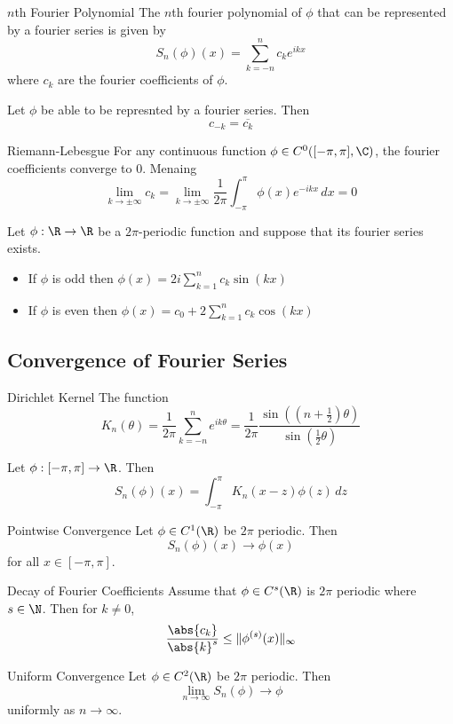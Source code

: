 \documentclass[a4paper]{article}
\begin{document}
\begin{defn}{$n$th Fourier Polynomial}{} The $n$th fourier polynomial of $\phi$ that can be represented by a fourier series is given by $$S_n(\phi)(x)=\sum_{k=-n}^nc_ke^{ikx}$$ where $c_k$ are the fourier coefficients of $\phi$. 
\end{defn}

\begin{lmm}{}{} Let $\phi$ be able to be represnted by a fourier series. Then $$c_{-k}=\overline{c_k}$$
\end{lmm}

\begin{lmm}{Riemann-Lebesgue}{} For any continuous function $\phi\in C^0([-\pi,\pi],\C)$, the fourier coefficients converge to $0$. Menaing $$\lim_{k\to\pm\infty}c_k=\lim_{k\to\pm\infty}\frac{1}{2\pi}\int_{-\pi}^\pi\phi(x)e^{-ikx}\,dx=0$$
\end{lmm}

\begin{lmm} Let $\phi:\R\to\R$ be a $2\pi$-periodic function and suppose that its fourier series exists. 
\begin{itemize}
\item If $\phi$ is odd then $\phi(x)=2i\sum_{k=1}^nc_k\sin(kx)$
\item If $\phi$ is even then $\phi(x)=c_0+2\sum_{k=1}^nc_k\cos(kx)$
\end{itemize}
\end{lmm}

\subsection{Convergence of Fourier Series}
\begin{defn}{Dirichlet Kernel}{} The function $$K_n(\theta)=\frac{1}{2\pi}\sum_{k=-n}^ne^{ik\theta}=\frac{1}{2\pi}\frac{\sin\left(\left(n+\frac{1}{2}\right)\theta\right)}{\sin\left(\frac{1}{2}\theta\right)}$$
\end{defn}

\begin{lmm}{}{} Let $\phi:[-\pi,\pi]\to\R$. Then $$S_n(\phi)(x)=\int_{-\pi}^\pi K_n(x-z)\phi(z)\,dz$$
\end{lmm}

\begin{thm}{Pointwise Convergence}{} Let $\phi\in C^1(\R)$ be $2\pi$ periodic.  Then $$S_n(\phi)(x)\to\phi(x)$$ for all $x\in[-\pi,\pi]$. 
\end{thm}

\begin{lmm}{Decay of Fourier Coefficients}{} Assume that $\phi\in C^s(\R)$ is $2\pi$ periodic where $s\in\N$. Then for $k\neq 0$, $$\frac{\abs{c_k}}{\abs{k}^s}\leq\|\phi^{(s)}(x)\|_\infty$$
\end{lmm}

\begin{thm}{Uniform Convergence}{} Let $\phi\in C^2(\R)$ be $2\pi$ periodic.  Then $$\lim_{n\to\infty}S_n(\phi)\to\phi$$ uniformly as $n\to\infty$. 
\end{thm}
\end{document}
